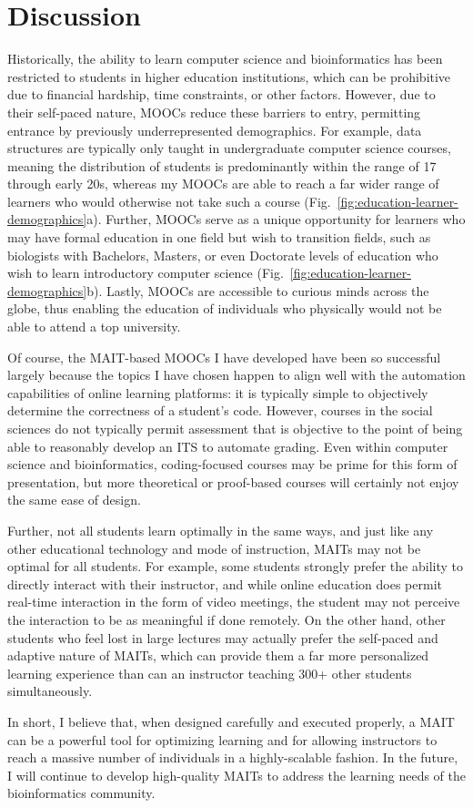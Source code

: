 \section{Discussion}
Historically, the ability to learn computer science and bioinformatics has been restricted to students in higher education institutions, which can be prohibitive due to financial hardship, time constraints, or other factors. However, due to their self-paced nature, \glspl{MOOC} reduce these barriers to entry, permitting entrance by previously underrepresented demographics. For example, data structures are typically only taught in undergraduate computer science courses, meaning the distribution of students is predominantly within the range of 17 through early 20s, whereas my \glspl{MOOC} are able to reach a far wider range of learners who would otherwise not take such a course (Fig.~\ref{fig:education-learner-demographics}a). Further, MOOCs serve as a unique opportunity for learners who may have formal education in one field but wish to transition fields, such as biologists with Bachelors, Masters, or even Doctorate levels of education who wish to learn introductory computer science (Fig.~\ref{fig:education-learner-demographics}b). Lastly, \glspl{MOOC} are accessible to curious minds across the globe, thus enabling the education of individuals who physically would not be able to attend a top university.

Of course, the \gls{MAIT}-based \glspl{MOOC} I have developed have been so successful largely because the topics I have chosen happen to align well with the automation capabilities of online learning platforms: it is typically simple to objectively determine the correctness of a student's code. However, courses in the social sciences do not typically permit assessment that is objective to the point of being able to reasonably develop an \gls{ITS} to automate grading. Even within computer science and bioinformatics, coding-focused courses may be prime for this form of presentation, but more theoretical or proof-based courses will certainly not enjoy the same ease of design.

Further, not all students learn optimally in the same ways, and just like any other educational technology and mode of instruction, \glspl{MAIT} may not be optimal for all students. For example, some students strongly prefer the ability to directly interact with their instructor, and while online education does permit real-time interaction in the form of video meetings, the student may not perceive the interaction to be as meaningful if done remotely. On the other hand, other students who feel lost in large lectures may actually prefer the self-paced and adaptive nature of \glspl{MAIT}, which can provide them a far more personalized learning experience than can an instructor teaching 300+ other students simultaneously.

In short, I believe that, when designed carefully and executed properly, a \gls{MAIT} can be a powerful tool for optimizing learning and for allowing instructors to reach a massive number of individuals in a highly-scalable fashion. In the future, I will continue to develop high-quality \glspl{MAIT} to address the learning needs of the bioinformatics community.

